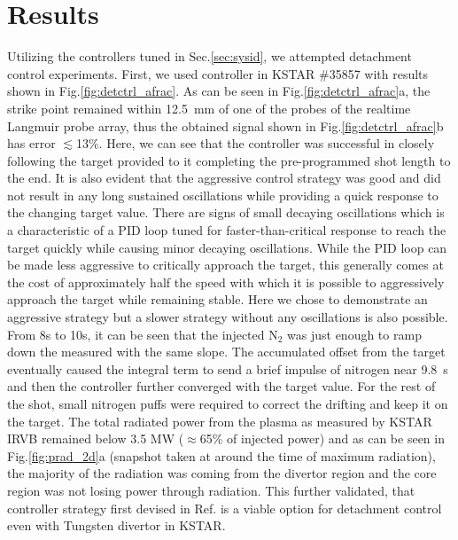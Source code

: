 \section{Results}
\label{sec:results}





Utilizing the controllers tuned in Sec.\ref{sec:sysid}, we attempted detachment control experiments.
First, we used \Afrac controller in KSTAR \#35857 with results shown in Fig.\ref{fig:detctrl_afrac}.
As can be seen in Fig.\ref{fig:detctrl_afrac}a, the strike point remained within 12.5~mm of one of the probes of the realtime Langmuir probe array, thus the obtained \Afrac signal shown in Fig.\ref{fig:detctrl_afrac}b has error $\lesssim$13\%.
Here, we can see that the controller was successful in closely following the target provided to it completing the pre-programmed shot length to the end.
It is also evident that the aggressive control strategy was good and did not result in any long sustained oscillations while providing a quick response to the changing target value.
There are signs of small decaying oscillations which is a characteristic of a PID loop tuned for faster-than-critical response to reach the target quickly while causing minor decaying oscillations.
While the PID loop can be made less aggressive to critically approach the target, this generally comes at the cost of approximately half the speed with which it is possible to aggressively approach the target while remaining stable.
Here we chose to demonstrate an aggressive strategy but a slower strategy without any oscillations is also possible.
From 8s to 10s, it can be seen that the injected N$_2$ was just enough to ramp down the measured \Afrac with the same slope.
The accumulated offset from the target eventually caused the integral term to send a brief impulse of nitrogen near 9.8~s and then the controller further converged with the target value.
For the rest of the shot, small nitrogen puffs were required to correct the drifting \Afrac and keep it on the target.
The total radiated power from the plasma as measured by KSTAR \ac{IRVB} remained below 3.5 MW ($\approx$65\% of injected power) and as can be seen in Fig.\ref{fig:prad_2d}a (snapshot taken at around the time of maximum radiation), the majority of the radiation was coming from the divertor region and the core region was not losing power through radiation.
This further validated, that \Afrac controller strategy first devised in Ref.\cite{Eldon_2022_PPCF} is a viable option for detachment control even with Tungsten divertor in KSTAR.

